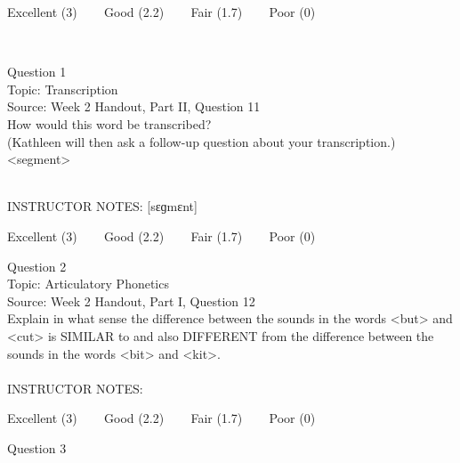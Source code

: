 \documentclass[12pt]{article}
\begin{document}
\vfill
Excellent (3) ~~~ Good (2.2) ~~~ Fair (1.7) ~~~ Poor (0)
\newpage

\begin{center}
\textbf{{\color{red}{\HUGE END OF EXAM}}}\\

\end{center}
\newpage

\begin{center}
\textbf{{\color{blue}{\HUGE START OF EXAM\\}}}

\textbf{{\color{blue}{\HUGE Student ID: 45517\\}}}

\textbf{{\color{blue}{\HUGE \\}}}

\end{center}
\newpage

{\large Question 1}\\

Topic: Transcription\\
Source: Week 2 Handout, Part II, Question 11\\

How would this word be transcribed?\\ (Kathleen will then ask a follow-up question about your transcription.)\\

<segment>


~\\
INSTRUCTOR NOTES: [sɛɡmɛnt]


\vfill
Excellent (3) ~~~ Good (2.2) ~~~ Fair (1.7) ~~~ Poor (0)
\newpage

{\large Question 2}\\

Topic: Articulatory Phonetics\\
Source: Week 2 Handout, Part I, Question 12\\

Explain in what sense the difference between the sounds in the words <but> and <cut> is SIMILAR to and also DIFFERENT from the difference between the sounds in the words <bit> and <kit>.\\


~\\
INSTRUCTOR NOTES: 


\vfill
Excellent (3) ~~~ Good (2.2) ~~~ Fair (1.7) ~~~ Poor (0)
\newpage

{\large Question 3}\\
\end{document}
